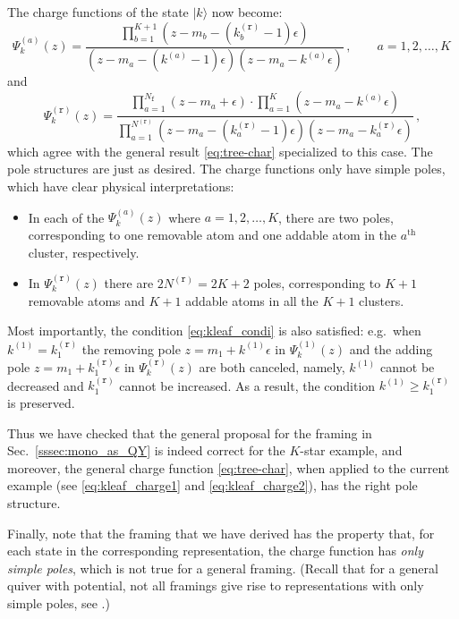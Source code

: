 \documentclass[12pt,a4paper]{article}
\renewcommand{\(}{\left(}
\renewcommand{\)}{\right)}
\renewcommand{\(}{\left(}
\renewcommand{\)}{\right)}
\begin{document}
The charge functions of the state $|k\rangle$ now become:
\begin{equation}\label{eq:kleaf_charge1}
\Psi^{(a)}_k(z)=\frac{\prod_{b=1}^{K+1}(z-m_b-(k^{(\mathtt{r})}_b-1)\epsilon)}{(z-m_a-(k^{(a)}-1)\epsilon)(z-m_a-k^{(a)}\epsilon)}\,,\qquad a=1,2,\dots,K\,
\end{equation}
and 
\begin{equation}\label{eq:kleaf_charge2}
\Psi^{(\mathtt{r})}_k(z)=\frac{\prod_{a=1}^{N_{\mathtt{f}}}(z-m_a+\epsilon)\cdot\prod_{a=1}^K(z-m_a-k^{(a)}\epsilon)}{\prod_{a=1}^{N^{(\mathtt{r})}}(z-m_a-(k^{(\mathtt{r})}_a-1)\epsilon)(z-m_a-k^{(\mathtt{r})}_a\epsilon)}\,,
\end{equation}
which agree with the general result \eqref{eq:tree-char} specialized to this case. 
The pole structures are just as desired. 
The charge functions only have simple poles, which have clear physical interpretations:
\begin{itemize}
\item In each of the $\Psi^{(a)}_k(z)$ where $a=1,2,\dots,K$, there are two poles, corresponding to one removable atom and one addable atom in the $a^{\textrm{th}}$ cluster, respectively.
\item In $\Psi^{(\mathtt{r})}_k(z)$ there are $2N^{(\mathtt{r})}=2K+2$ poles, corresponding to $K+1$ removable atoms and $K+1$ addable atoms in all the $K+1$ clusters.
\end{itemize}
Most importantly, the condition \eqref{eq:kleaf_condi} is also satisfied: e.g.\ when $k^{(1)}=k^{(\mathtt{r})}_1$ the removing pole $z=m_1+k^{(1)}\epsilon$ in $\Psi^{(1)}_k(z)$ and the adding pole $z=m_1+k^{(\mathtt{r})}_1\epsilon$ in $\Psi^{(\mathtt{r})}_k(z)$ are both canceled, namely, $k^{(1)}$ cannot be decreased and $k^{(\mathtt{r})}_1$ cannot be increased. 
As a result, the condition $k^{(1)}\geq k^{(\mathtt{r})}_1$ is preserved.

\medskip

Thus we have checked that the general proposal for the  framing in  Sec.~\ref{sssec:mono_as_QY} is indeed correct for the $K$-star example, and moreover, the general charge function \eqref{eq:tree-char}, when applied to the current example (see \eqref{eq:kleaf_charge1} and \eqref{eq:kleaf_charge2}), has the right pole structure.

\medskip

Finally, note that the framing that we have derived has the property that, for each state in the corresponding representation, the charge function has \textit{only simple poles}, which is not true for a general framing.
(Recall that for a general quiver with potential, not all framings give rise to representations with only simple poles, see \cite{Li:2023zub}.)
\end{document}
